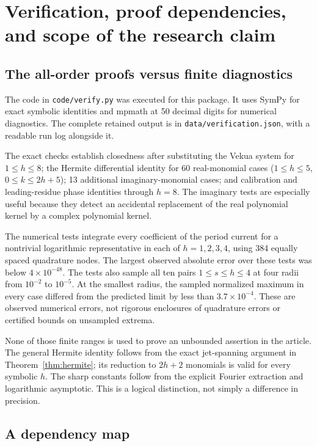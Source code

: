\documentclass[11pt,a4paper]{article}
\numberwithin{equation}{section}
\theoremstyle{definition}
\theoremstyle{remark}
\begin{document}
\section{Verification, proof dependencies, and scope of the research claim}
\label{sec:audit}

\subsection{The all-order proofs versus finite diagnostics}

The code in \texttt{code/verify.py} was executed for this package. It uses
SymPy for exact symbolic identities and mpmath at 50 decimal digits for
numerical diagnostics. The complete retained output is in
\texttt{data/verification.json}, with a readable run log alongside it.

The exact checks establish closedness after substituting the Vekua system for
$1\le h\le8$; the Hermite differential identity for 60 real-monomial cases
($1\le h\le5$, $0\le k\le2h+5$); 13 additional imaginary-monomial cases;
and calibration and leading-residue phase identities through $h=8$.
The imaginary tests are especially useful because they detect an accidental
replacement of the real polynomial kernel by a complex polynomial kernel.

The numerical tests integrate every coefficient of the period current for a
nontrivial logarithmic representative in each of $h=1,2,3,4$, using 384 equally
spaced quadrature nodes. The largest observed absolute error over these tests
was below $4\times10^{-48}$. The tests also sample all ten pairs
$1\le s\le h\le4$ at four radii from $10^{-2}$ to $10^{-5}$. At the smallest
radius, the sampled normalized maximum in every case differed from the
predicted limit by less than $3.7\times10^{-4}$. These are observed numerical
errors, not rigorous enclosures of quadrature errors or certified bounds on
unsampled extrema.

None of those finite ranges is used to prove an unbounded assertion in the
article. The general Hermite identity follows from the exact jet-spanning
argument in Theorem~\ref{thm:hermite}; its reduction to $2h+2$ monomials is
valid for every symbolic $h$. The sharp constants follow from the explicit
Fourier extraction and logarithmic asymptotic. This is a logical distinction,
not simply a difference in precision.

\subsection{A dependency map}
\end{document}
